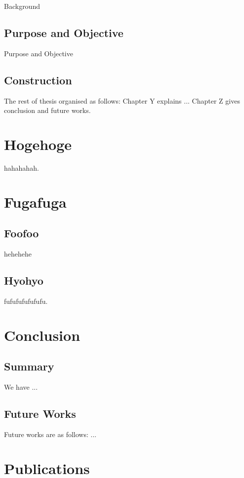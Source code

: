 \documentclass[12pt,epsf]{report}
\begin{document}
{{{{Background

\section{Purpose and Objective}

Purpose and Objective

\section{Construction}
The rest of thesis organised as follows:
Chapter Y explains ... 
Chapter Z gives conclusion and future works.


\chapter{Hogehoge}

hahahahah.

\chapter{Fugafuga}
\section{Foofoo}
hehehehe

\section{Hyohyo}

fufufufufufufu.

\chapter{Conclusion}
\section{Summary}

We have ...

\section{Future Works}

Future works are as follows: ...

\newpage

\chapter*{Publications}

}}}}
\end{document}
